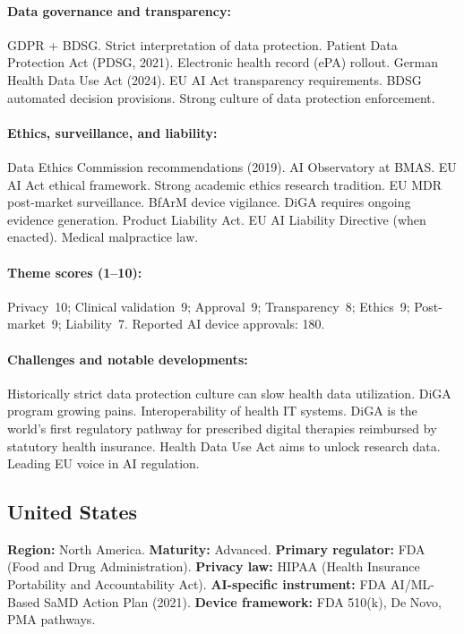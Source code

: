 {\paragraph{Data governance and transparency:}
GDPR + BDSG. Strict interpretation of data protection. Patient Data Protection Act (PDSG, 2021). Electronic health record (ePA) rollout. German Health Data Use Act (2024).
EU AI Act transparency requirements. BDSG automated decision provisions. Strong culture of data protection enforcement.

\paragraph{Ethics, surveillance, and liability:}
Data Ethics Commission recommendations (2019). AI Observatory at BMAS. EU AI Act ethical framework. Strong academic ethics research tradition.
EU MDR post-market surveillance. BfArM device vigilance. DiGA requires ongoing evidence generation.
Product Liability Act. EU AI Liability Directive (when enacted). Medical malpractice law.

\paragraph{Theme scores (1--10):}
Privacy~10;
Clinical validation~9;
Approval~9;
Transparency~8;
Ethics~9;
Post-market~9;
Liability~7.
Reported AI device approvals: 180.

\paragraph{Challenges and notable developments:}
Historically strict data protection culture can slow health data utilization. DiGA program growing pains. Interoperability of health IT systems.
DiGA is the world's first regulatory pathway for prescribed digital therapies reimbursed by statutory health insurance. Health Data Use Act aims to unlock research data. Leading EU voice in AI regulation.


\subsection{United States}
\textbf{Region:} North America.
\textbf{Maturity:} Advanced.
\textbf{Primary regulator:} FDA (Food and Drug Administration).
\textbf{Privacy law:} HIPAA (Health Insurance Portability and Accountability Act).
\textbf{AI-specific instrument:} FDA AI/ML-Based SaMD Action Plan (2021).
\textbf{Device framework:} FDA 510(k), De Novo, PMA pathways.

}
